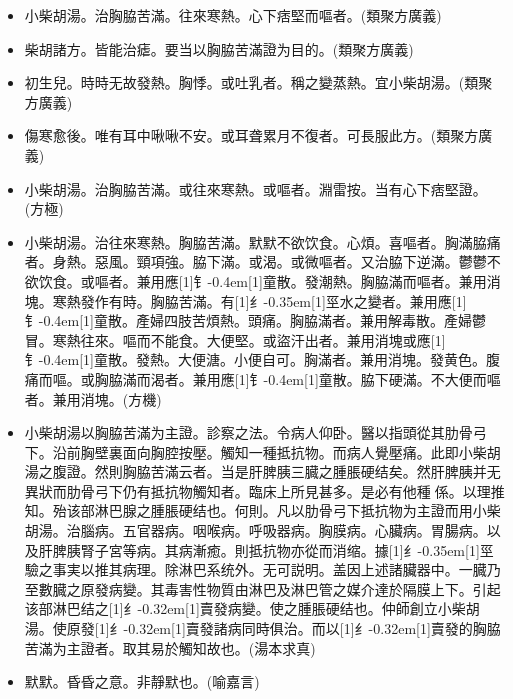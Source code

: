 \documentclass[11pt,oneside,b5paper]{ctexbook}
\begin{document}
\begin{flushleft}
\begin{itemize}
\item 小柴胡湯。治胸脇苦滿。往來寒熱。心下痞堅而嘔者。(類聚方廣義)
\item 柴胡諸方。皆能治瘧。要当以胸脇苦滿證为目的。(類聚方廣義)
\item 初生兒。時時无故發熱。胸悸。或吐乳者。稱之變蒸熱。宜小柴胡湯。(類聚方廣義)
\item 傷寒愈後。唯有耳中啾啾不安。或耳聋累月不復者。可長服此方。(類聚方廣義)
\item 小柴胡湯。治胸脇苦滿。或往來寒熱。或嘔者。淵雷按。当有心下痞堅證。(方極)
\item 小柴胡湯。治往來寒熱。胸脇苦滿。默默不欲饮食。心煩。喜嘔者。胸滿脇痛者。身熱。惡風。頸項強。脇下滿。或渴。或微嘔者。又治脇下逆滿。鬱鬱不欲饮食。或嘔者。兼用應{\hbox{\scalebox{0.7}[1]{钅}\kern-0.4em\scalebox{0.7}[1]{童}}}散。發潮熱。胸脇滿而嘔者。兼用消塊。寒熱發作有時。胸脇苦滿。有{\hbox{\scalebox{0.68}[1]{纟}\kern-0.35em\scalebox{0.64}[1]{巠}}}水之變者。兼用應{\hbox{\scalebox{0.7}[1]{钅}\kern-0.4em\scalebox{0.7}[1]{童}}}散。產婦四肢苦煩熱。頭痛。胸脇滿者。兼用解毒散。產婦鬱冒。寒熱往來。嘔而不能食。大便堅。或盜汗出者。兼用消塊或應{\hbox{\scalebox{0.7}[1]{钅}\kern-0.4em\scalebox{0.7}[1]{童}}}散。發熱。大便溏。小便自可。胸滿者。兼用消塊。發黄色。腹痛而嘔。或胸脇滿而渴者。兼用應{\hbox{\scalebox{0.7}[1]{钅}\kern-0.4em\scalebox{0.7}[1]{童}}}散。脇下硬滿。不大便而嘔者。兼用消塊。(方機)
\item 小柴胡湯以胸脇苦滿为主證。診察之法。令病人仰卧。醫以指頭從其肋骨弓下。沿前胸壁裏面向胸腔按壓。觸知一種抵抗物。而病人覺壓痛。此即小柴胡湯之腹證。然則胸脇苦滿云者。当是肝脾胰三臓之腫脹硬结矣。然肝脾胰并无異狀而肋骨弓下仍有抵抗物觸知者。臨床上所見甚多。是必有他種{𬮦}係。以理推知。殆该部淋巴腺之腫脹硬结也。何則。凡以肋骨弓下抵抗物为主證而用小柴胡湯。治腦病。五官器病。咽喉病。呼吸器病。胸膜病。心臟病。胃腸病。以及肝脾胰腎子宮等病。其病漸癒。則抵抗物亦從而消缩。據{\hbox{\scalebox{0.68}[1]{纟}\kern-0.35em\scalebox{0.64}[1]{巠}}}驗之事実以推其病理。除淋巴系统外。无可説明。盖因上述諸臟器中。一臓乃至數臓之原發病變。其毒害性物質由淋巴及淋巴管之媒介達於隔膜上下。引起该部淋巴结之{\hbox{\scalebox{0.6}[1]{纟}\kern-0.32em\scalebox{0.7}[1]{賣}}}發病變。使之腫脹硬结也。仲師創立小柴胡湯。使原發{\hbox{\scalebox{0.6}[1]{纟}\kern-0.32em\scalebox{0.7}[1]{賣}}}發諸病同時俱治。而以{\hbox{\scalebox{0.6}[1]{纟}\kern-0.32em\scalebox{0.7}[1]{賣}}}發的胸脇苦滿为主證者。取其易於觸知故也。(湯本求真)
\item 默默。昏昏之意。非靜默也。(喻嘉言)
\end{itemize}


\end{flushleft}
\end{document}
